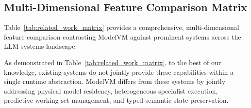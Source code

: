 \subsection{Multi-Dimensional Feature Comparison Matrix}
\label{sec:feature_matrix}

Table~\ref{tab:related_work_matrix} provides a comprehensive, multi-dimensional feature comparison contrasting ModelVM against prominent systems across the LLM systems landscape.

As demonstrated in Table~\ref{tab:related_work_matrix}, to the best of our knowledge, existing systems do not jointly provide these capabilities within a single runtime abstraction. ModelVM differs from these systems by jointly addressing physical model residency, heterogeneous specialist execution, predictive working-set management, and typed semantic state preservation.
\FloatBarrier


